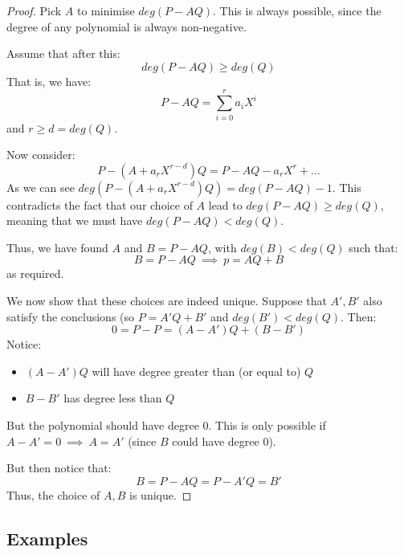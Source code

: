 \documentclass{exam}
\begin{document}

\begin{proof}

Pick $A$ to minimise $deg(P - AQ)$. This is always possible, since the degree of any polynomial is always non-negative.

\bigskip

Assume that after this:
\[
deg(P - AQ) \geq deg(Q)
\]
That is, we have:
\[
P - AQ = \sum_{i = 0}^r a_iX^i
\]
and $r \geq d = deg(Q)$.

\bigskip

Now consider:
\[
P - (A + a_rX^{r - d})Q = P - AQ - a_rX^r + \ldots
\]
As we can see $deg(P - (A + a_rX^{r - d})Q) = deg(P - AQ) - 1$. This contradicts the fact that our choice of $A$ lead to $deg(P - AQ) \geq deg(Q)$, meaning that we must have $deg(P - AQ) < deg(Q)$.

\bigskip

Thus, we have found $A$ and $B = P - AQ$, with $deg(B) < deg(Q)$ such that:
\[
B = P - AQ \ \implies \ p = AQ + B
\]
as required.

\bigskip

We now show that these choices are indeed unique. Suppose that $A', B'$ also satisfy the conclusions (so $P = A'Q + B'$ and $deg(B') < deg(Q)$. Then:
\[
0 = P - P = (A - A')Q + (B - B')
\]
Notice:
\begin{itemize}
    \item $(A - A')Q$ will have degree greater than (or equal to) $Q$
    \item $B - B'$ has degree less than $Q$
\end{itemize}
But the polynomial should have degree 0. This is only possible if $A - A' = 0 \ \implies \ A = A'$ (since $B$ could have degree 0).

\bigskip

But then notice that:
\[
B = P - AQ = P - A'Q = B'
\]
Thus, the choice of $A,B$ is unique.

\end{proof}

\subsection{Examples}
\end{document}
